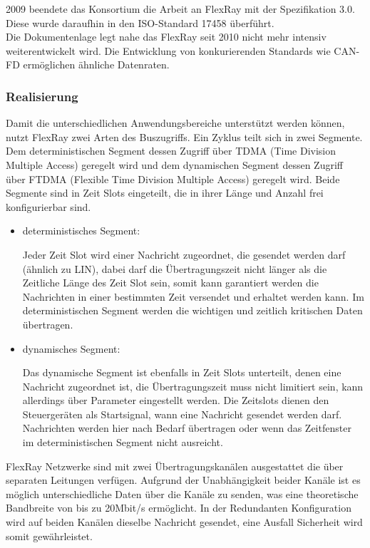     2009 beendete das Konsortium die Arbeit an FlexRay mit der Spezifikation 3.0. Diese wurde
    daraufhin in den ISO-Standard 17458 überführt.\\
    Die Dokumentenlage legt nahe das FlexRay seit 2010 nicht mehr intensiv weiterentwickelt 
    wird. 
    Die Entwicklung von konkurierenden Standards wie CAN-FD ermöglichen ähnliche Datenraten.
    ~\cite{LA_FR1}

    \subsubsection{Realisierung}

    Damit die unterschiedlichen Anwendungsbereiche unterstützt werden können, nutzt FlexRay
    zwei Arten des Buszugriffs.
    Ein Zyklus teilt sich in zwei Segmente. Dem deterministischen Segment dessen Zugriff über
    TDMA (Time Division Multiple Access) geregelt wird und dem dynamischen Segment dessen 
    Zugriff über FTDMA (Flexible Time Division Multiple Access) geregelt wird.
    Beide Segmente sind in Zeit Slots eingeteilt, die in ihrer Länge und Anzahl frei konfigurierbar sind.\\
    \begin{itemize}
    \item{deterministisches Segment:}
    
    Jeder Zeit Slot wird einer Nachricht zugeordnet, die gesendet werden darf (ähnlich zu LIN), 
    dabei darf die Übertragungszeit nicht länger als die Zeitliche Länge des Zeit Slot sein, somit kann
    garantiert werden die Nachrichten in einer bestimmten Zeit versendet und erhaltet werden
    kann. Im deterministischen Segment werden die wichtigen und zeitlich kritischen Daten
    übertragen. \\
    
    \item{dynamisches Segment:}

    Das dynamische Segment ist ebenfalls in Zeit Slots unterteilt, denen eine Nachricht zugeordnet ist,
    die Übertragungszeit muss nicht limitiert sein, kann allerdings über Parameter eingestellt werden. 
    Die Zeitslots dienen den Steuergeräten als Startsignal, wann eine Nachricht gesendet werden darf. 
    Nachrichten werden hier nach Bedarf übertragen oder wenn das Zeitfenster im deterministischen Segment 
    nicht ausreicht.\\
    \end{itemize}

    FlexRay Netzwerke sind mit zwei Übertragungskanälen ausgestattet die über separaten Leitungen 
    verfügen. Aufgrund der Unabhängigkeit beider Kanäle ist es möglich unterschiedliche Daten über
    die Kanäle zu senden, was eine theoretische Bandbreite von bis zu 20Mbit/s ermöglicht. 
    In der Redundanten Konfiguration wird auf beiden Kanälen dieselbe Nachricht gesendet, eine 
    Ausfall Sicherheit wird somit gewährleistet.~\cite{LA_FR3}\\
    
